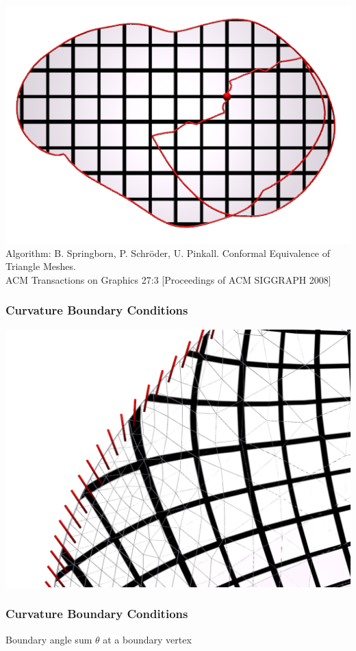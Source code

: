 \documentclass[12pt]{beamer}
\begin{document}
\begin{frame}
	\includegraphics[width=0.25\linewidth]{conformal_curvature_domain.png}\\
\vspace{0.5cm}
\tiny{Algorithm: B. Springborn, P. Schr\"oder, U. Pinkall. Conformal Equivalence of Triangle Meshes. \\
ACM Transactions on Graphics 27:3 [Proceedings of ACM SIGGRAPH 2008]}
\end{frame}

\begin{frame}
	\frametitle{Curvature Boundary Conditions}
	\includegraphics[width=0.8\linewidth]{boundary_closeup.png}
\end{frame}


\begin{frame}
  \frametitle{Curvature Boundary Conditions}
\scalebox{1.5} {
  
}
Boundary angle sum $\theta$ at a boundary vertex
\end{frame}
\end{document}
